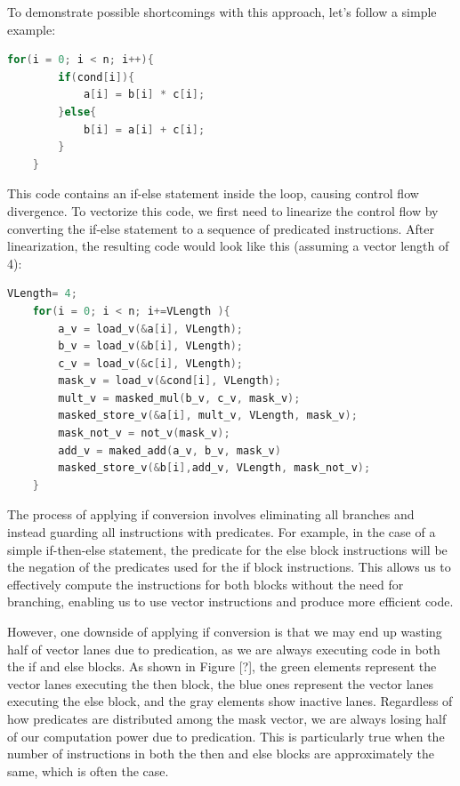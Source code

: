 \documentclass[\main/thesis.tex]{subfiles}
\begin{document}
To demonstrate possible shortcomings with this approach, let's follow a simple example: 
\begin{lstlisting}[language=C, caption={Motivating Example}]
    for(i = 0; i < n; i++){
        if(cond[i]){
            a[i] = b[i] * c[i];
        }else{
            b[i] = a[i] + c[i];
        }
    }
\end{lstlisting}

This code contains an if-else statement inside the loop, causing control flow divergence. To vectorize this code, we first need to linearize the control flow by converting the if-else statement to a sequence of predicated instructions. After linearization, the resulting code would look like this (assuming a vector length of 4):


\begin{lstlisting}[language=C]
    VLength= 4;
    for(i = 0; i < n; i+=VLength ){
        a_v = load_v(&a[i], VLength);
        b_v = load_v(&b[i], VLength);
        c_v = load_v(&c[i], VLength);
        mask_v = load_v(&cond[i], VLength);
        mult_v = masked_mul(b_v, c_v, mask_v);
        masked_store_v(&a[i], mult_v, VLength, mask_v);
        mask_not_v = not_v(mask_v);
        add_v = maked_add(a_v, b_v, mask_v)
        masked_store_v(&b[i],add_v, VLength, mask_not_v);
    }
\end{lstlisting}

The process of applying if conversion involves eliminating all branches and instead guarding all instructions with predicates. For example, in the case of a simple if-then-else statement, the predicate for the else block instructions will be the negation of the predicates used for the if block instructions. This allows us to effectively compute the instructions for both blocks without the need for branching, enabling us to use vector instructions and produce more efficient code.

However, one downside of applying if conversion is that we may end up wasting half of vector lanes due to predication, as we are always executing code in both the if and else blocks. As shown in Figure [?], the green elements represent the vector lanes executing the then block, the blue ones represent the vector lanes executing the else block, and the gray elements show inactive lanes. Regardless of how predicates are distributed among the mask vector, we are always losing half of our computation power due to predication. This is particularly true when the number of instructions in both the then and else blocks are approximately the same, which is often the case.
\end{document}
